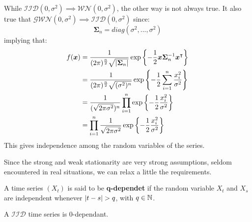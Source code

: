 \begin{remark}
    While $\mathcal{IID}(0,\sigma^2)\implies\mathcal{WN}(0,\sigma^2)$, the other way is not always true. It also true that $\mathcal{GWN}(0,\sigma^2)\implies\mathcal{IID}(0,\sigma^2)$ since:
    \[
        \boldsymbol{\Sigma}_{n}=diag(\sigma^2,...,\sigma^2)  
    \]
    implying that:
    \begin{equation*}
        \begin{split}
            f(\boldsymbol{x})&=\frac{1}{(2\pi)^{\frac{n}{2}}\sqrt{\left|\boldsymbol{\Sigma}_{n}\right|}}\exp\left\{-\frac{1}{2}\boldsymbol{x}\boldsymbol{\Sigma}_n^{-1}\boldsymbol{x}^\intercal\right\}\\
            &=\frac{1}{(2\pi)^{\frac{n}{2}}\sqrt{(\sigma^2)^n}}\exp\left\{-\frac{1}{2}\sum_{i=1}^{n}\frac{x_i^2}{\sigma^2}\right\}\\
            &=\frac{1}{(\sqrt{2\pi\sigma^2})^n}\prod_{i=1}^n\exp\left\{-\frac{1}{2}\frac{x_i^2}{\sigma^2}\right\}\\
            &=\prod_{i=1}^n\frac{1}{\sqrt{2\pi\sigma^2}}\exp\left\{-\frac{1}{2}\frac{x_i^2}{\sigma^2}\right\}\\
        \end{split}
    \end{equation*}
    This gives independence among the random variables of the series.
\end{remark}

Since the strong and weak stationarity are very strong assumptions, seldom encountered in real situations, we can relax a little the requirements.

\begin{definition}
    A time series $(X_t)$ is said to be \textbf{q-dependet} if the random variable $X_t$ and $X_s$ are independent whenever $\abs{t-s}>q$, with $q\in\mathbb{N}$.
\end{definition}

\begin{example}
    A $\mathcal{IID}$ time series is 0-dependant.
\end{example}

